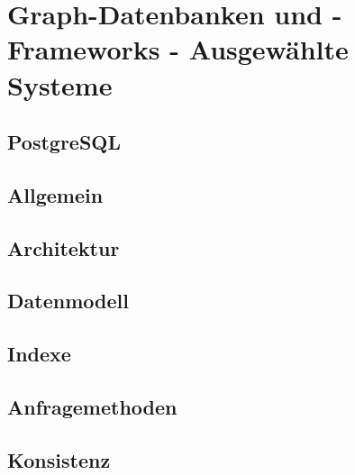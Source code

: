 \chapter{Graph-Datenbanken und -Frameworks - Ausgewählte Systeme }
\section{PostgreSQL}
\section{Allgemein}
\section{Architektur}
\section{Datenmodell}
\section{Indexe}
\section{Anfragemethoden}
\section{Konsistenz}